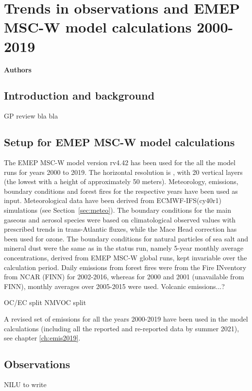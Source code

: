 \chapter[Trends]{Trends in observations and EMEP MSC-W model calculations 2000-2019}
\label{ch:Trends}

{\bf{Authors}}\\


\section{\label{sec:Trends_introduction}Introduction and background}
GP review bla bla


\section{\label{EMEPmodelcalc}{Setup for EMEP MSC-W model calculations}}
The EMEP MSC-W model version rv4.42 has been used for the all the model runs for years 2000 to 2019. The horizontal resolution is \resZO, with 20 vertical layers (the lowest with a height of approximately 50 meters).
 Meteorology, emissions, boundary conditions and forest fires for the respective years have been used as input. Meteorological data have been
 derived from ECMWF-IFS(cy40r1) simulations (see Section~\ref{sec:meteo}). 
 The boundary conditions for the main gaseous and aerosol species were based on climatological observed values with prescribed trends in trans-Atlantic fluxes, while the Mace
Head correction has been used for ozone. The boundary conditions for natural particles of
sea salt and mineral dust were the same as in the status run, namely 5-year monthly average
concentrations, derived from EMEP MSC-W global runs, kept invariable over the calculation
period.
Daily emissions from forest fires were from the Fire INventory from NCAR (FINN) for 2002-2016,
whereas for 2000 and 2001 (unavailable from FINN), monthly averages over 2005-2015 were
used.
 Volcanic emissions...?
 
 OC/EC split
 NMVOC split
 
A revised set of emissions for all the years 2000-2019 have been used in the model calculations (including all the reported and re-reported data by summer 2021), see chapter \ref{ch:emis2019}.

\section{\label{OBSTrends}{Observations}} NILU to write

